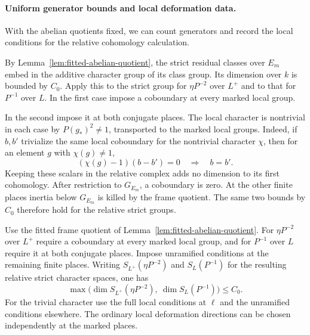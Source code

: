 \paragraph{Uniform generator bounds and local deformation data.}
With the abelian quotients fixed, we can count generators and record the local
conditions for the relative cohomology calculation.

By Lemma~\ref{lem:fitted-abelian-quotient}, the strict residual
classes over \(E_m\) embed in the additive character group of its
class group. Its dimension over \(k\) is bounded by \(C_0\).
Apply this to the strict group for \(\eta P^{-2}\) over
\(L^+\) and to that for \(P^{-1}\) over \(L\). In the
first case impose a coboundary at every marked local
group.

In the second impose it at both conjugate places.
The local character is nontrivial in each case by
\(P(g_*)^2\ne1\), transported to the marked local groups.
Indeed, if \(b,b'\) trivialize the same local coboundary for the nontrivial character \(\chi\), then for an element \(g\) with \(\chi(g)\ne1\),
\[
 (\chi(g)-1)(b-b')=0\quad\Longrightarrow\quad b=b' .
\]
Keeping these scalars in the relative complex adds no
dimension to its first cohomology. After restriction to
\(G_{E_m}\), a coboundary is zero. At the other finite
places inertia below \(G_{E_m}\) is killed by the frame
quotient. The same two bounds by \(C_0\) therefore hold for
the relative strict groups.

\begin{lemma}
\label{lem:fitted-local-generators}
Use the fitted frame quotient of Lemma~\ref{lem:fitted-abelian-quotient}.
For \(\eta P^{-2}\) over \(L^+\) require a coboundary at every marked
local group, and for \(P^{-1}\) over \(L\) require it at both conjugate
places. Impose unramified conditions at the remaining finite places.
Writing \(S_{L^+}(\eta P^{-2})\) and \(S_L(P^{-1})\) for the resulting
relative strict character spaces, one has
\[
  \max\bigl(\dim S_{L^+}(\eta P^{-2}),\ \dim S_L(P^{-1})\bigr)\le C_0.
\]
For the trivial character use the full local conditions at \(\ell\)
and the unramified conditions elsewhere. The ordinary local deformation
directions can be chosen independently at the marked places.
\end{lemma}


